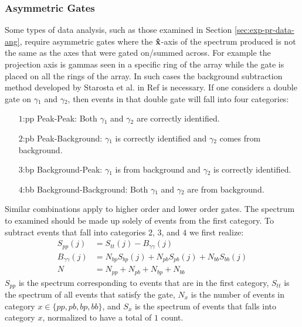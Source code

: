 \subsubsection{Asymmetric Gates}
\label{sssec:exp-pr-data-proc-bg-sub-asym}
Some types of data analysis, such as those examined in Section \ref{sec:exp-pr-data-ang}, require asymmetric gates where the $\boldsymbol{\hat{\textbf{x}}}$-axis of the spectrum produced is not the same as the axes that were gated on/summed across. For example the projection axis is gammas seen in a specific ring of the array while the gate is placed on all the rings of the array. In such cases the background subtraction method developed by Starosta et al. in Ref \cite{asymBGSub} is necessary. If one considers a double gate on $\gamma{}_1$ and $\gamma{}_2$, then events in that double gate will fall into four categories:
\begin{enumerate}
\item[$1$:pp] Peak-Peak: Both $\gamma{}_1$ and $\gamma{}_2$ are correctly identified.
\item[$2$:pb] Peak-Background: $\gamma{}_1$ is correctly identified and $\gamma{}_2$ comes from background.
\item[$3$:bp] Background-Peak: $\gamma{}_1$ is from background and $\gamma{}_2$ is correctly identified.
\item[$4$:bb] Background-Background: Both $\gamma{}_1$ and $\gamma{}_2$ are from background.
\end{enumerate}
Similar combinations apply to higher order and lower order gates. The spectrum to examined should be made up solely of events from the first category. To subtract events that fall into categories $2$, $3$, and $4$ we first realize:
\begin{align}
S_{pp}(j) &= S_{tt}(j) - B_{\gamma{}\gamma{}}(j)\label{eqn:chp3-asym-pp}\\
B_{\gamma{}\gamma{}}(j) &= N_{bp}S_{bp}(j) + N_{pb}S_{pb}(j) + N_{bb}S_{bb}(j)\label{eqn:chp3-asym-gg}\\
N &= N_{pp} + N_{pb} + N_{bp} + N_{bb} \label{eqn:chp3-asym-N}
\end{align}
$S_{pp}$ is the spectrum corresponding to events that are in the first category, $S_{tt}$ is the spectrum of all events that satisfy the gate, $N_{x}$ is the number of events in category $x\in{}\{pp,pb,bp,bb\}$, and $S_{x}$ is the spectrum of events that falls into category $x$, normalized to have a total of $1$ count.

